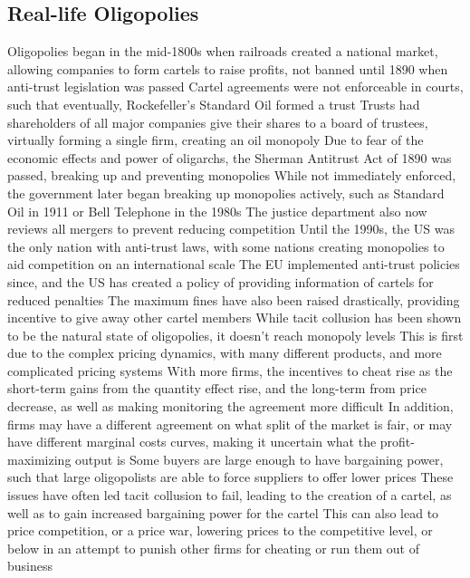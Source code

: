 \documentclass[11 pt, twoside]{article}
\newenvironment{outline*}
{
	\begin{outline}[enumerate]
	}
	{\end{outline}
}
\begin{document}
\subsection{Real-life Oligopolies}
\begin{outline*}
\1 Oligopolies began in the mid-1800s when railroads created a national market, allowing companies to form cartels to raise profits, not banned until 1890 when anti-trust legislation was passed
\2 Cartel agreements were not enforceable in courts, such that eventually, Rockefeller's Standard Oil formed a trust
\3 Trusts had shareholders of all major companies give their shares to a board of trustees, virtually forming a single firm, creating an oil monopoly
\2 Due to fear of the economic effects and power of oligarchs, the Sherman Antitrust Act of 1890 was passed, breaking up and preventing monopolies
\3 While not immediately enforced, the government later began breaking up monopolies actively, such as Standard Oil in 1911 or Bell Telephone in the 1980s
\3 The justice department also now reviews all mergers to prevent reducing competition
\2 Until the 1990s, the US was the only nation with anti-trust laws, with some nations creating monopolies to aid competition on an international scale
\3 The EU implemented anti-trust policies since, and the US has created a policy of providing information of cartels for reduced penalties
\3 The maximum fines have also been raised drastically, providing incentive to give away other cartel members
\1 While tacit collusion has been shown to be the natural state of oligopolies, it doesn't reach monopoly levels
\2 This is first due to the complex pricing dynamics, with many different products, and more complicated pricing systems
\2 With more firms, the incentives to cheat rise as the short-term gains from the quantity effect rise, and the long-term from price decrease, as well as making monitoring the agreement more difficult
\2 In addition, firms may have a different agreement on what split of the market is fair, or may have different marginal costs curves, making it uncertain what the profit-maximizing output is
\2 Some buyers are large enough to have bargaining power, such that large oligopolists are able to force suppliers to offer lower prices
\2 These issues have often led tacit collusion to fail, leading to the creation of a cartel, as well as to gain increased bargaining power for the cartel
\3 This can also lead to price competition, or a price war, lowering prices to the competitive level, or below in an attempt to punish other firms for cheating or run them out of business

\end{outline*}
\end{document}
